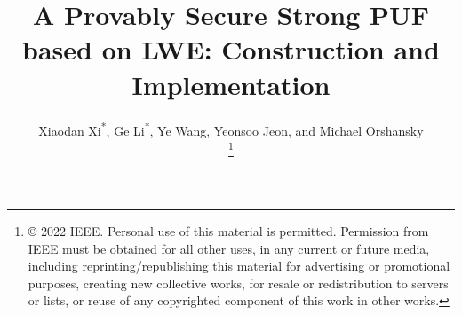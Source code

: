 \documentclass[9.5pt,journal,compsoc]{IEEEtran}
\begin{document}


\title{A Provably Secure Strong PUF based on LWE: Construction and Implementation}

\author{Xiaodan Xi\textsuperscript{*}, Ge Li\textsuperscript{*}, Ye Wang, Yeonsoo Jeon, and Michael Orshansky

\thanks {© 2022 IEEE.  Personal use of this material is permitted.  Permission from IEEE must be obtained for all other uses, in any current or future media, including reprinting/republishing this material for advertising or promotional purposes, creating new collective works, for resale or redistribution to servers or lists, or reuse of any copyrighted component of this work in other works.}}
\end{document}
